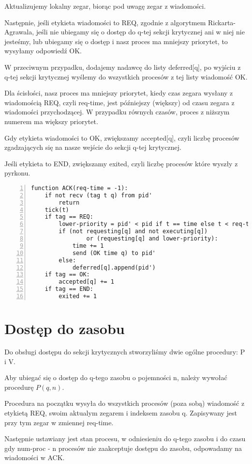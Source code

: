 \documentclass[11pt]{article}
\begin{document}
Aktualizujemy lokalny zegar, biorąc pod uwagę zegar z wiadomości.

Następnie, jeśli etykieta wiadomości to REQ, zgodnie z algorytmem Rickarta-Agrawala,
jeśli nie ubiegamy się o dostęp do q-tej sekcji krytycznej ani w niej nie jesteśmy,
lub ubiegamy się o dostęp i nasz proces ma mniejszy priorytet,
to wysyłamy odpowiedź OK.

W przeciwnym przypadku, dodajemy nadawcę do listy deferred[q],
po wyjściu z q-tej sekcji krytycznej wyślemy do wszystkich procesów z tej listy wiadomość OK.

Dla ścisłości, nasz proces ma mniejszy priorytet, kiedy czas zegara wysłany z wiadomością REQ, czyli req-time,
jest późniejszy (większy) od czasu zegara z wiadomości przychodzącej.
W przypadku równych czasów, proces z niższym numerem ma większy priorytet. 

Gdy etykieta wiadomości to OK, zwiększamy accepted[q],
czyli liczbę procesów zgadzających się na nasze wejście do sekcji q-tej krytycznej.

Jeśli etykieta to END, zwiększamy exited,
czyli liczbę procesów które wyszły z pyrkonu.

\begin{Verbatim}[numbers=left,xleftmargin=5mm]
function ACK(req-time = -1):
    if not recv (tag t q) from pid'
        return
    tick(t)
    if tag == REQ:
        lower-priority = pid' < pid if t == time else t < req-time
        if (not requesting[q] and not executing[q])
                or (requesting[q] and lower-priority):
            time += 1
            send (OK time q) to pid'
        else:
            deferred[q].append(pid')
    if tag == OK:
        accepted[q] += 1
    if tag == END:
        exited += 1
\end{Verbatim}

\section{Dostęp do zasobu}

Do obsługi dostępu do sekcji krytycznych stworzyliśmy dwie ogólne procedury: P i V.

Aby ubiegać się o dostęp do q-tego zasobu o pojemności n, należy wywołać procedurę $P(q, n)$.

Procedura na początku wysyła do wszystkich procesów (poza sobą) wiadomość z etykietą REQ, swoim aktualym zegarem i indeksem zasobu q.
Zapisywany jest przy tym zegar w zmiennej req-time.

Następnie ustawiany jest stan procesu, w odniesieniu do q-tego zasobu i do czasu gdy num-proc - n procesów nie zaakceptuje dostępu do zasobu,
odpowadamy na wiadomości w ACK.
\end{document}

